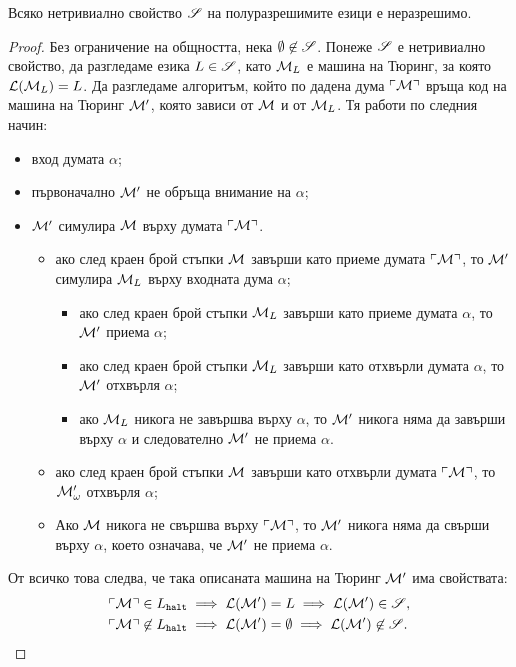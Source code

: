 \begin{framed}
  \begin{thm}[Райс]
    Всяко нетривиално свойство $\mathscr{S}$ на полуразрешимите езици е неразрешимо.
  \end{thm}  
\end{framed}
\begin{proof}
  Без ограничение на общността, нека $\emptyset \not\in \mathscr{S}$.
  Понеже $\mathscr{S}$ е нетривиално свойство, да разгледаме езика $L \in \mathscr{S}$,
  като $\mathcal{M}_L$ е машина на Тюринг, за която $\mathcal{L}(\mathcal{M}_L) = L$.
  Да разгледаме алгоритъм, който по дадена дума $\ulcorner{\mathcal{M}}\urcorner$
  връща код на машина на Тюринг $\mathcal{M}'$, която зависи от $\mathcal{M}$ и от $\mathcal{M}_L$.
  Тя работи по следния начин:
  \begin{itemize}
  \item
    вход думата $\alpha$;
  \item
    първоначално $\mathcal{M}'$ не обръща внимание на $\alpha$;
  \item
    $\mathcal{M}'$ симулира $\mathcal{M}$ върху думата $\ulcorner{\mathcal{M}}\urcorner$.
    \begin{itemize}
    \item
      ако след краен брой стъпки $\mathcal{M}$ завърши като приеме думата $\ulcorner{\mathcal{M}}\urcorner$, то 
      $\mathcal{M}'$ симулира $\mathcal{M}_L$ върху входната дума $\alpha$;
      \begin{itemize}
      \item
        ако след краен брой стъпки $\mathcal{M}_L$ завърши като приеме думата $\alpha$, то 
        $\mathcal{M}'$ приема $\alpha$;
      \item 
        ако след краен брой стъпки $\mathcal{M}_L$ завърши като отхвърли думата $\alpha$, то 
        $\mathcal{M}'$ отхвърля $\alpha$;
      \item
        ако $\mathcal{M}_L$ никога не завършва върху $\alpha$, то 
        $\mathcal{M}'$ никога няма да завърши върху $\alpha$ и следователно $\mathcal{M}'$
        не приема $\alpha$.
      \end{itemize}
    \item
      ако след краен брой стъпки $\mathcal{M}$ завърши като отхвърли думата $\ulcorner{\mathcal{M}}\urcorner$, то 
      $\mathcal{M}'_\omega$ отхвърля $\alpha$;
    \item
      Ако $\mathcal{M}$ никога не свършва върху $\ulcorner{\mathcal{M}}\urcorner$, то $\mathcal{M}'$ никога няма да свърши върху $\alpha$,
      което означава, че $\mathcal{M}'$ не приема $\alpha$.      
    \end{itemize}
  \end{itemize}
  От всичко това следва, че така описаната машина на Тюринг $\mathcal{M}'$ има свойствата:
  \begin{align*}
    & \ulcorner{\mathcal{M}}\urcorner \in L_{\texttt{halt}} \implies \mathcal{L}(\mathcal{M}') = L \implies \mathcal{L}(\mathcal{M}') \in \mathscr{S},\\
    & \ulcorner{\mathcal{M}}\urcorner \not\in L_{\texttt{halt}} \implies \mathcal{L}(\mathcal{M}') = \emptyset \implies \mathcal{L}(\mathcal{M}') \not\in \mathscr{S}.
  \end{align*}


\end{proof}
